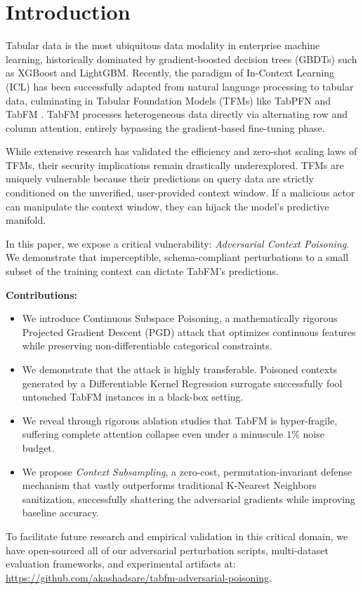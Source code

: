 \section{Introduction}
Tabular data is the most ubiquitous data modality in enterprise machine learning, historically dominated by gradient-boosted decision trees (GBDTs) such as XGBoost \cite{chen2016xgboost} and LightGBM. Recently, the paradigm of In-Context Learning (ICL) has been successfully adapted from natural language processing to tabular data, culminating in Tabular Foundation Models (TFMs) like TabPFN \cite{hollmann2022tabpfn} and TabFM \cite{kong2026tabfm}. TabFM processes heterogeneous data directly via alternating row and column attention, entirely bypassing the gradient-based fine-tuning phase.

While extensive research has validated the efficiency and zero-shot scaling laws of TFMs, their security implications remain drastically underexplored. TFMs are uniquely vulnerable because their predictions on query data are strictly conditioned on the unverified, user-provided context window. If a malicious actor can manipulate the context window, they can hijack the model's predictive manifold.

In this paper, we expose a critical vulnerability: \textit{Adversarial Context Poisoning}. We demonstrate that imperceptible, schema-compliant perturbations to a small subset of the training context can dictate TabFM's predictions.

\textbf{Contributions:}
\begin{itemize}
    \item We introduce Continuous Subspace Poisoning, a mathematically rigorous Projected Gradient Descent (PGD) attack that optimizes continuous features while preserving non-differentiable categorical constraints.
    \item We demonstrate that the attack is highly transferable. Poisoned contexts generated by a Differentiable Kernel Regression surrogate successfully fool untouched TabFM instances in a black-box setting.
    \item We reveal through rigorous ablation studies that TabFM is hyper-fragile, suffering complete attention collapse even under a minuscule $1\%$ noise budget.
    \item We propose \textit{Context Subsampling}, a zero-cost, permutation-invariant defense mechanism that vastly outperforms traditional K-Nearest Neighbors sanitization, successfully shattering the adversarial gradients while improving baseline accuracy.
\end{itemize}

To facilitate future research and empirical validation in this critical domain, we have open-sourced all of our adversarial perturbation scripts, multi-dataset evaluation frameworks, and experimental artifacts at: \url{https://github.com/akashadsare/tabfm-adversarial-poisoning}.

